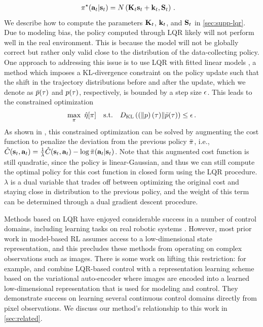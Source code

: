 \begin{align*}
    &\pi^\star(\mathbf{a}_t|\mathbf{s}_t)=N\left(\mathbf{K}_t\mathbf{s}_t+\mathbf{k}_t,\mathbf{S}_t\right)\,.
\end{align*}
We describe how to compute the parameters $\mathbf{K}_t$, $\mathbf{k}_t$, and $\mathbf{S}_t$ in \autoref{sec:supp-lqr}. Due to modeling bias, the policy computed through LQR likely will not perform well in the real environment. This is because the model will not be globally correct but rather only valid close to the distribution of the data-collecting policy. One approach to addressing this issue is to use LQR with fitted linear models \citep[\mbox{LQR-FLM}; ][]{mfcgps}, a method which imposes a KL-divergence constraint on the policy update such that the shift in the trajectory distributions before and after the update, which we denote as $\bar{p}(\tau)$ and $p(\tau)$, respectively, is bounded by a step size $\epsilon$. This leads to the constrained optimization
\begin{align}
    \max_\policy~\hat{\policyobj}[\policy]\text{\ \ \ s.t.\ \ \ }D_\KL(p(\traj)\|\bar{p}(\traj))\leq\polstepsize\,.\label{eq:lqrflm}
\end{align}
As shown in \citet{mfcgps}, this constrained optimization can be solved by augmenting the cost function to penalize the deviation from the previous policy $\bar{\pi}$, i.e., $\tilde{C}(\mathbf{s}_t,\mathbf{a}_t)=\frac{1}{\lambda}\hat{C}(\mathbf{s}_t,\mathbf{a}_t)-\log\bar{\pi}(\mathbf{a}_t|\mathbf{s}_t)$. Note that this augmented cost function is still quadratic, since the policy is linear-Gaussian, and thus we can still compute the optimal policy for this cost function in closed form using the LQR procedure. $\lambda$ is a dual variable that trades off between optimizing the original cost and staying close in distribution to the previous policy, and the weight of this term can be determined through a dual gradient descent procedure.

Methods based on LQR have enjoyed considerable success in a number of control domains, including learning tasks on real robotic systems \citep{ilqg,gps}. However, most prior work in model-based RL assumes access to a low-dimensional state representation, and this precludes these methods from operating on complex observations such as images. There is some work on lifting this restriction: for example, \citet{e2c} and \citet{rce} combine LQR-based control with a representation learning scheme based on the variational auto-encoder \citep[VAE; ][]{Kingma2014,Rezende2014} where images are encoded into a learned low-dimensional representation that is used for modeling and control. They demonstrate success on learning several continuous control domains directly from pixel observations. We discuss our method's relationship to this work in \autoref{sec:related}.


